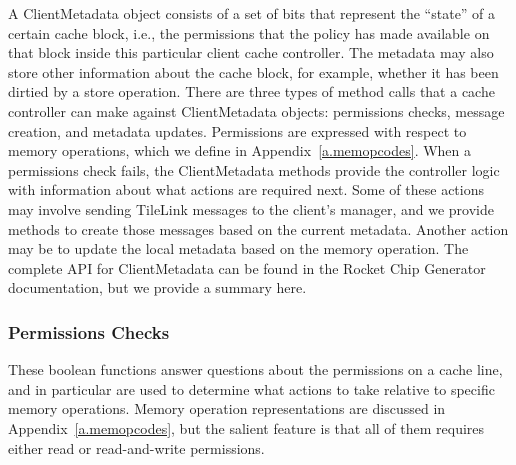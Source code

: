 A ClientMetadata object consists of a set of bits that represent the ``state'' of a certain cache block,
i.e., the permissions that the policy has made available on that block inside this particular client cache controller.
The metadata may also store other information about the cache block,
for example, whether it has been dirtied by a store operation.
There are three types of method calls that a cache controller can make against ClientMetadata objects:
permissions checks, message creation, and metadata updates.
Permissions are expressed with respect to memory operations, which we define in Appendix~\ref{a.memopcodes}.
When a permissions check fails, the ClientMetadata methods provide the controller logic with information about what actions are required next.
Some of these actions may involve sending TileLink messages to the client's manager, and we provide methods to create those messages
based on the current metadata.
Another action may be to update the local metadata based on the memory operation.
The complete API for ClientMetadata can be found in the Rocket Chip Generator~\cite{rocket} documentation, but we provide a summary here.

\subsubsection{Permissions Checks}

These boolean functions answer questions about the permissions on a cache line, and in particular are used to determine what actions to take relative to specific memory operations.
Memory operation representations are discussed in Appendix~\ref{a.memopcodes}, but the salient feature is that
all of them requires either read or read-and-write permissions.

